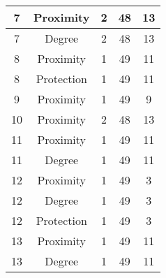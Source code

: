 \documentclass[results.tex]{subfiles}
\begin{document}
\begin{center}
\begin{tabular}{| c || c | c | c | c |}
            \hline
            7                       & Proximity                    & 2                      & 48                      & 13                   \\
            \hline
            7                       & Degree                       & 2                      & 48                      & 13                   \\
            \hline
            8                       & Proximity                    & 1                      & 49                      & 11                   \\
            \hline
            8                       & Protection                   & 1                      & 49                      & 11                   \\
            \hline
            9                       & Proximity                    & 1                      & 49                      & 9                    \\
            \hline
            10                      & Proximity                    & 2                      & 48                      & 13                   \\
            \hline
            11                      & Proximity                    & 1                      & 49                      & 11                   \\
            \hline
            11                      & Degree                       & 1                      & 49                      & 11                   \\
            \hline
            12                      & Proximity                    & 1                      & 49                      & 3                    \\
            \hline
            12                      & Degree                       & 1                      & 49                      & 3                    \\
            \hline
            12                      & Protection                   & 1                      & 49                      & 3                    \\
            \hline
            13                      & Proximity                    & 1                      & 49                      & 11                   \\
            \hline
            13                      & Degree                       & 1                      & 49                      & 11                   \\

\end{tabular}
\end{center}
\end{document}
